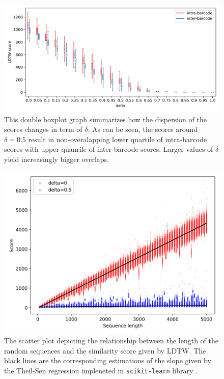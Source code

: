 \begin{figure}[!ht]
    \centering
    \includegraphics[scale=0.7]{images/delta_raw_boxplot.pdf}
    \caption[Scores dispersion in terms of $\delta$]{This double boxplot graph summarizes how the dispersion of the scores changes in term of $\delta$. As can be seen, the scores around $\delta = 0.5$ result in non-overalapping lower quartile of intra-barcode scores with upper quanrile of inter-barcode scores. Larger values of $\delta$ yield increasingly bigger overlaps.}
    \label{fig:delta_boxplot}
\end{figure}

\begin{figure}[!ht]
    \centering
    \includegraphics[scale=0.8]{images/rand_align_dpi.png}
    \caption[Random sequences LDTW scores]{The scatter plot depicting the relationship between the length of the random sequences and the similarity score given by LDTW. The black lines are the corresponding estimations of the slope given by the Theil-Sen regression impleneted in \texttt{scikit-learn} library \cite{scikit-learn}.}
    \label{fig:rand_align}
\end{figure}

